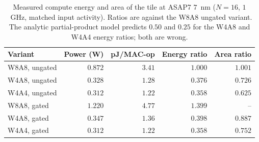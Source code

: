 \begin{table}[h]
\centering
\footnotesize
\caption{Measured compute energy and area of the tile at ASAP7 $7$~nm
($N=16$, $1$~GHz, matched input activity). Ratios are against the W8A8 ungated
variant. The analytic partial-product model predicts $0.50$ and $0.25$ for the
W4A8 and W4A4 energy ratios; both are wrong.}
\label{tab:energy}
\begin{tabular}{@{}lrrrr@{}}
\toprule
Variant & Power (W) & pJ/MAC-op & Energy ratio & Area ratio \\
\midrule
W8A8, ungated & $0.872$ & $3.41$ & $1.000$ & $1.001$ \\
W4A8, ungated & $0.328$ & $1.28$ & $\mathbf{0.376}$ & $0.726$ \\
W4A4, ungated & $0.312$ & $1.22$ & $\mathbf{0.358}$ & $0.625$ \\
W8A8, gated   & $1.220$ & $4.77$ & $1.399$ & -- \\
W4A8, gated   & $0.347$ & $1.36$ & $0.398$ & $0.887$ \\
W4A4, gated   & $0.312$ & $1.22$ & $0.358$ & $0.752$ \\
\bottomrule
\end{tabular}
\end{table}
